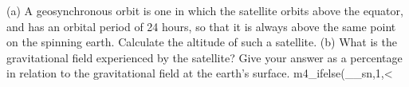        (a) A geosynchronous orbit is one in which the satellite orbits above the
        equator, and has an orbital period of 24 hours, so that it is always above
        the same point on the spinning earth. 
        Calculate the altitude of such a satellite.\answercheck\hwendpart
        (b) What is the gravitational field experienced by the satellite? Give your
        answer as a percentage in relation to the gravitational field at the earth's
        surface.%
m4_ifelse(__sn,1,<%
\answercheck\hwendpart
